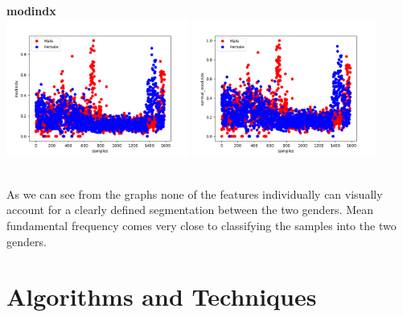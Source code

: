 \documentclass[12pt]{article}
\begin{document}
\begin{justify}
			\textbf{modindx}\\
				\includegraphics[width=6cm]{../Graphs2/modindx}
				\includegraphics[width=6cm]{../Graphs2/norm_modindx}
				
			\textnormal{\\As we can see from the graphs none of the features individually can visually account for a clearly defined segmentation between the two genders. Mean fundamental frequency comes very close to classifying the samples into the two genders.}
		\end{justify}
	\section{Algorithms and Techniques}
\end{document}
